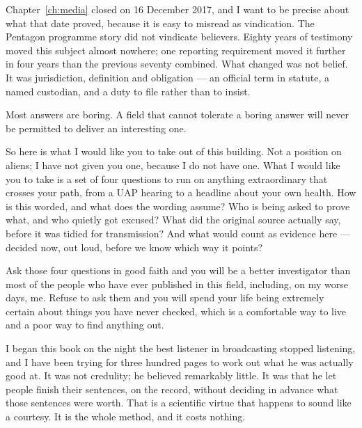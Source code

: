 Chapter~\ref{ch:media} closed on 16 December 2017, and I want to be precise about
what that date proved, because it is easy to misread as vindication. The Pentagon
programme story did not vindicate believers. Eighty years of testimony moved this
subject almost nowhere; one reporting requirement moved it further in four years
than the previous seventy combined. What changed was not belief. It was
jurisdiction, definition and obligation --- an official term in statute, a named
custodian, and a duty to file rather than to insist.



Most answers are boring. A field that cannot tolerate a boring
answer will never be permitted to deliver an interesting one.

So here is what I would like you to take out of this building. Not a position on
aliens; I have not given you one, because I do not have one. What I would like
you to take is a set of four questions to run on anything extraordinary that
crosses your path, from a UAP hearing to a headline about your own health. How is
this worded, and what does the wording assume? Who is being asked to prove what,
and who quietly got excused? What did the original source actually say, before it
was tidied for transmission? And what would count as evidence here --- decided
now, out loud, before we know which way it points?

Ask those four questions in good faith and you will be a better investigator than
most of the people who have ever published in this field, including, on my worse
days, me. Refuse to ask them and you will spend your life being extremely certain
about things you have never checked, which is a comfortable way to live and a poor
way to find anything out.

I began this book on the night the best listener in broadcasting stopped
listening, and I have been trying for three hundred pages to work out what he was
actually good at. It was not credulity; he believed remarkably little. It was
that he let people finish their sentences, on the record, without deciding in
advance what those sentences were worth. That is a scientific virtue that happens
to sound like a courtesy. It is the whole method, and it costs nothing.

